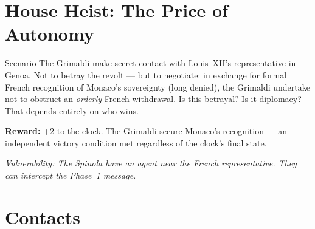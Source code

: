 \section{House Heist: The Price of Autonomy}
\label{sec:grimaldi-heist}


\begin{rulebox}[GrimaldiPurple]{Scenario}
The Grimaldi make secret contact with Louis~XII's representative in Genoa.
Not to betray the revolt --- but to negotiate: in exchange for formal French
recognition of Monaco's sovereignty (long denied), the Grimaldi undertake
not to obstruct an \textit{orderly} French withdrawal.
Is this betrayal? Is it diplomacy? That depends entirely on who wins.
\end{rulebox}




\textbf{Reward:} +2 to the clock. The Grimaldi secure Monaco's recognition ---
an independent victory condition met regardless of the clock's final state.

\textit{Vulnerability: The Spinola have an agent near the French representative.
They can intercept the Phase~1 message.}

\section{Contacts}

